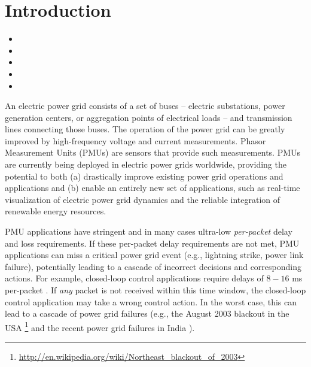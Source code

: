 

\section{Introduction}
\label{sec:intro}

\begin{framed}
\begin{itemize}
        \item {} 
        \item {} 
        \item {} 
        \item {}
		\item {}
\end{itemize}
\end{framed}
               

An electric power grid consists of a set of buses  -- electric substations, power generation centers, or aggregation points of electrical loads -- and transmission lines connecting those buses.
The operation of the power grid can be greatly improved by high-frequency voltage and current measurements. Phasor Measurement Units (PMUs) are  
sensors that provide such measurements. PMUs are currently being deployed in electric power grids worldwide, providing the potential to both 
(a) drastically improve existing power grid operations and applications and (b) enable an entirely new set of applications,
such as real-time visualization of electric power grid dynamics and the reliable integration of renewable energy resources. 

PMU applications have stringent and in many cases ultra-low \emph{per-packet} delay and loss requirements.  
If these per-packet delay requirements are not met, PMU applications can miss a critical power grid event (e.g., lightning strike, power link failure), potentially leading to a 
cascade of incorrect decisions and corresponding actions. For example, closed-loop control applications require delays of $8-16$ ms per-packet \cite{Bakken11}. 
If \emph{any} packet is not received within this time window, the closed-loop control application may take a wrong control action.
In the worst case, this can lead to a cascade of power grid failures (e.g., the August 2003 blackout in the USA 
\footnote{\url{http://en.wikipedia.org/wiki/Northeast\_blackout\_of\_2003}} and the recent power grid failures in India \cite{IndiaBlackout}). 


